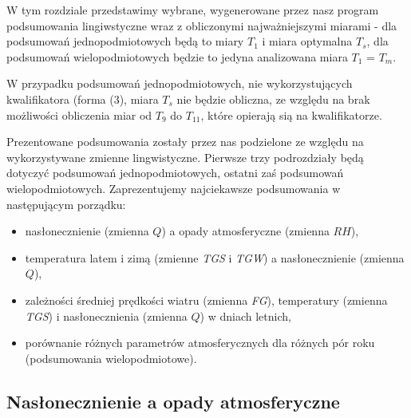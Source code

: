 \documentclass{classrep}
\begin{document}
W tym rozdziale przedstawimy wybrane, wygenerowane przez nasz program podsumowania lingiwstyczne wraz z obliczonymi najważniejszymi miarami - dla podsumowań jednopodmiotowych będą to miary $T_1$ i miara optymalna $T_s$, dla podsumowań wielopodmiotowych będzie to jedyna analizowana miara $T_1$ = $T_m$.\newline

W przypadku podsumowań jednopodmiotowych, nie wykorzystujących kwalifikatora (forma (3), miara $T_s$ nie będzie obliczna, ze względu na brak możliwości obliczenia miar od $T_9$ do $T_{11}$, które opierają sią na kwalifikatorze.\newline

Prezentowane podsumowania zostały przez nas podzielone ze względu na wykorzystywane zmienne lingwistyczne. Pierwsze trzy podrozdziały będą dotyczyć podsumowań jednopodmiotowych, ostatni zaś podsumowań wielopodmiotowych. Zaprezentujemy najciekawsze podsumowania w następującym porządku:

\begin{itemize}[label=$\bullet$\scshape\bfseries]
\item nasłonecznienie (zmienna $Q$) a opady atmosferyczne (zmienna $RH$),
\item temperatura latem i zimą (zmienne \textit{TGS} i \textit{TGW}) a nasłonecznienie (zmienna $Q$),
\item zależności średniej prędkości wiatru (zmienna \textit{FG}), temperatury (zmienna \textit{TGS}) i nasłonecznienia (zmienna $Q$) w dniach letnich,
\item porównanie różnych parametrów atmosferycznych dla różnych pór roku (podsumowania wielopodmiotowe).
\end{itemize}

\clearpage

\subsection{Nasłonecznienie a opady atmosferyczne}
\end{document}

